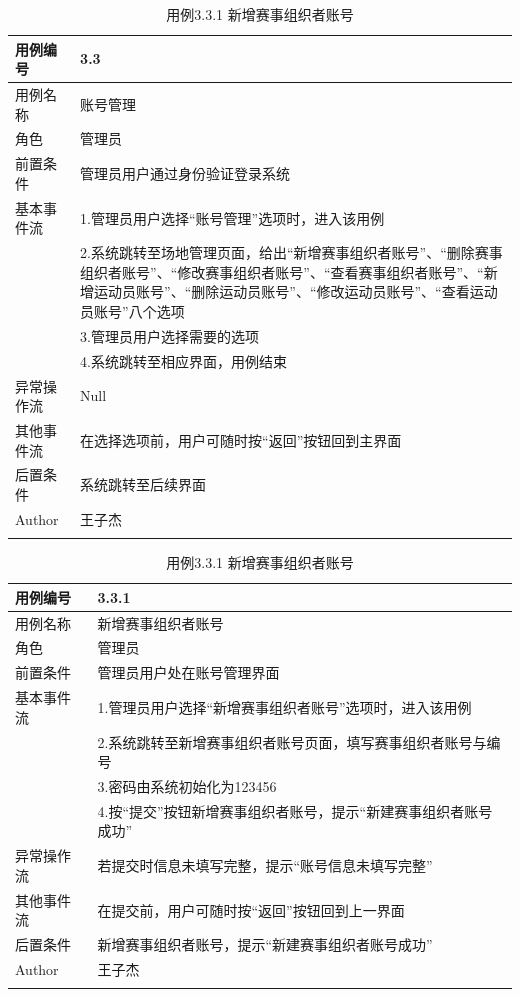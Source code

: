 \documentclass[a4paper,UTF8]{article}
\begin{document}
\begin{table}[H]
	\begin{center}
		\caption{用例3.3 账号管理}
		\label{table:Tab_uc33}
		\begin{tabular}{|p{}|p{}|}
			\hline\noalign{\smallskip}
			用例编号 & 3.3\\
			\hline
			用例名称 &  账号管理\\
			\hline
			角色 & 管理员\\
			\hline
			前置条件 & 管理员用户通过身份验证登录系统 \\
			\hline
			基本事件流 & 1.管理员用户选择“账号管理”选项时，进入该用例 \\& 2.系统跳转至场地管理页面，给出“新增赛事组织者账号”、“删除赛事组织者账号”、“修改赛事组织者账号”、“查看赛事组织者账号”、“新增运动员账号”、“删除运动员账号”、“修改运动员账号”、“查看运动员账号”八个选项 \\& 3.管理员用户选择需要的选项 \\& 4.系统跳转至相应界面，用例结束\\
			\hline
			异常操作流 & Null \\
			\hline
			其他事件流 & 在选择选项前，用户可随时按“返回”按钮回到主界面 \\
			\hline
			后置条件 & 系统跳转至后续界面 \\
			\hline
			Author & 王子杰 \\
			\noalign{\smallskip}
			\hline
			\noalign{\smallskip}
		\end{tabular}
		\caption{用例3.3.1 新增赛事组织者账号}
		\label{table:Tab_uc331}
		\begin{tabular}{|p{}|p{}|}
			\hline\noalign{\smallskip}
			用例编号 & 3.3.1\\
			\hline
			用例名称 &  新增赛事组织者账号\\
			\hline
			角色 & 管理员\\
			\hline
			前置条件 & 管理员用户处在账号管理界面 \\
			\hline
			基本事件流 & 1.管理员用户选择“新增赛事组织者账号”选项时，进入该用例 \\& 2.系统跳转至新增赛事组织者账号页面，填写赛事组织者账号与编号 \\ & 3.密码由系统初始化为123456 \\& 4.按“提交”按钮新增赛事组织者账号，提示“新建赛事组织者账号成功” \\
			\hline
			异常操作流 & 若提交时信息未填写完整，提示“账号信息未填写完整”\\
			\hline
			其他事件流 & 在提交前，用户可随时按“返回”按钮回到上一界面 \\
			\hline
			后置条件 & 新增赛事组织者账号，提示“新建赛事组织者账号成功”\\
			\hline
			Author & 王子杰 \\
			\noalign{\smallskip}
			\hline
			\noalign{\smallskip}
		\end{tabular}
	\end{center}
\end{table}
\end{document}
